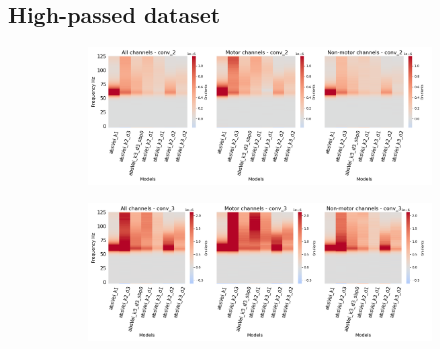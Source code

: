 \subsection*{High-passed dataset}\label{subsec:absVel-high-passed-dataset-appendixA}
\begin{figure}[!htb]
\centering
\begin{subfigure}[a]{\textwidth}
   \includegraphics[width=0.9\linewidth]{img/appendix/A/conv-2/hp-m/absVel-model-gradients_all_kinds}
   \caption{}
   \label{fig:absVel-hp-grads-conv-2}
\end{subfigure}

\begin{subfigure}[b]{\textwidth}
   \includegraphics[width=0.9\linewidth]{img/appendix/A/conv-3/hp-m/absVel-model-gradients_all_kinds}
   \caption{}
   \label{fig:absVel-hp-grads-conv-3}
\end{subfigure}
\end{figure}
\clearpage   

